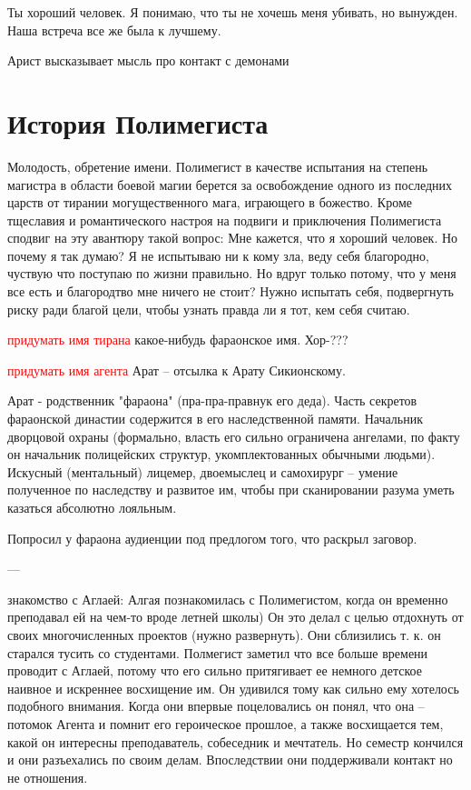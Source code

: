 \documentclass[12pt,a4paper]{article}
\newcommand{\tr}[1]{\textcolor{red}{#1}}
\begin{document}
Ты хороший человек. Я понимаю, что ты не хочешь меня убивать, но вынужден. Наша встреча все же была к лучшему.

Арист высказывает мысль про контакт с демонами


\section*{История Полимегиста}

Молодость, обретение имени. 
Полимегист в качестве испытания на степень магистра в области боевой магии берется за освобождение одного из последних царств от тирании могущественного мага, играющего в божество.
Кроме тщеславия и романтического настроя на подвиги и приключения Полимегиста сподвиг на эту авантюру такой вопрос: Мне кажется, что я хороший человек. Но почему я так думаю? Я не испытываю ни к кому зла, веду себя благородно, чуствую что поступаю по жизни правильно. Но вдруг только потому, что у меня все есть и благородтво мне ничего не стоит? Нужно испытать себя, подвергнуть риску ради благой цели, чтобы узнать правда ли я тот, кем себя считаю.

\tr{придумать имя тирана} какое-нибудь фараонское имя. Хор-???

\tr{придумать имя агента}
Арат -- отсылка к Арату Сикионскому.

Арат - родственник "фараона" (пра-пра-правнук его деда). Часть секретов фараонской династии содержится в его наследственной памяти. Начальник дворцовой охраны (формально, власть его сильно ограничена ангелами, по факту он начальник полицейских структур, укомплектованных обычными людьми). Искусный (ментальный) лицемер, двоемыслец и самохирург -- умение полученное по наследству и развитое им, чтобы при сканировании разума уметь казаться абсолютно лояльным.


Попросил у фараона аудиенции под предлогом того, что раскрыл заговор.



---

знакомство с Аглаей:
Алгая познакомилась с Полимегистом, когда он временно преподавал ей на чем-то вроде летней школы)
Он это делал с целью отдохнуть от своих многочисленных проектов (нужно развернуть). Они сблизились т. к. он старался тусить со студентами. Полмегист заметил что все больше времени проводит с Аглаей, потому что его сильно притягивает ее немного детское наивное и искреннее восхищение им. Он удивился тому как сильно ему хотелось подобного внимания. Когда они впервые поцеловались он понял, что она -- потомок Агента и помнит его героическое прошлое, а также восхищается тем, какой он интересны преподаватель, собеседник и мечтатель.
Но семестр кончился и они разъехались по своим делам.
Впоследствии они поддерживали контакт но не отношения.
\end{document}
